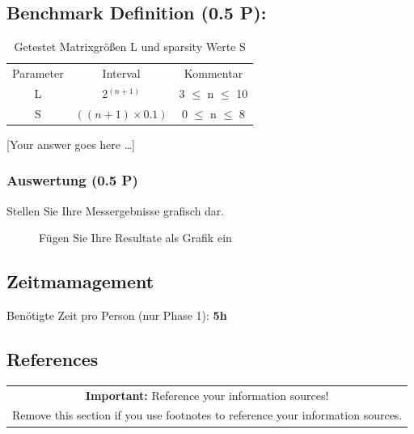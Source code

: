 \documentclass[11pt]{scrartcl}
\newcommand{\youranswerhere}{[Your answer goes here \ldots]}
\begin{document}
\subsection*{Benchmark Definition (0.5 P):}

\begin{table}[h]
	\centering
		\begin{center}
			\begin{tabular}{ c c c }
				Parameter & Interval & Kommentar\\
				L & 2$^{(n + 1)}$ & 3 $\leq$ n $\leq$ 10 \\
				S & $((n + 1) \times 0.1)$ & 0 $\leq$ n $\leq$ 8 \\
			\end{tabular}
			\end{center}
	\caption{Getestet Matrixgrößen L und sparsity Werte S}
	\label{tab:MatrixgrößenLUndSparsityWerteS}
\end{table}

\youranswerhere{}

\subsubsection*{Auswertung (0.5 P)}

Stellen Sie Ihre Messergebnisse grafisch dar. 

\begin{figure}
	\centering

	\caption{Fügen Sie Ihre Resultate als Grafik ein}
	\label{fig:results}
\end{figure}


\subsection*{Zeitmamagement}

Benötigte Zeit pro Person (nur Phase 1): \textbf{5h}

\subsection*{References}

\begin{table}[H]
  \centering
  \begin{tabular}{c}
    \hline
    \textbf{Important:} Reference your information sources! \tabularnewline
    Remove this section if you use footnotes to reference your information sources. \tabularnewline
    \hline
  \end{tabular}
\end{table}
\end{document}
